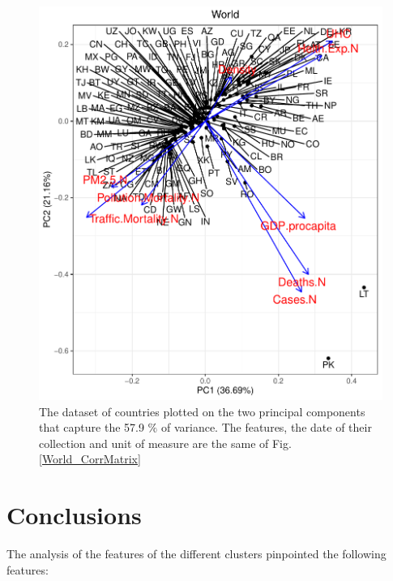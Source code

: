 \documentclass[
12pt, %
a4paper, %
oneside, %
headinclude,footinclude, %
BCOR5mm, %
]{scrartcl}
\begin{document}
\begin{figure}[h]
\begin{center}
\includegraphics[scale=1]{Pic/World_FULLPCA.pdf}
\caption{The dataset of countries plotted on the two principal components that capture the 57.9 $\% $ of variance. The features, the date of their collection and unit of measure are the same of Fig. \ref{World_CorrMatrix}}
\label{World_FULL_PCA}
\end{center}
\end{figure}


\clearpage


\section{Conclusions}

The analysis of the features of the different clusters pinpointed the following features: 
\end{document}
